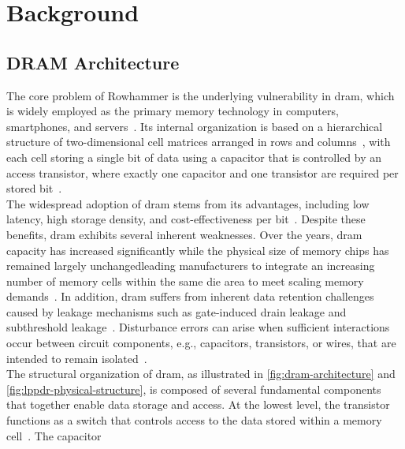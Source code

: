 \section{Background} \label{sec:background}
  \subsection{DRAM Architecture} \label{subsec:dram-architecture}
    The core problem of Rowhammer is the underlying vulnerability in \gls{dram}, which is widely employed as the primary memory technology in 
    computers, smartphones, and servers~\cite{thesisDRAMA, paperRHinDRAM}. Its internal organization is based on a 
    hierarchical structure of two-dimensional cell matrices arranged in rows and columns~\cite{paperRHinDRAM, paperRowhammerOnSteroids, paperDrammer}, 
    with each cell storing  a single bit of data using a capacitor that is controlled by 
    an access transistor, where exactly 
    one capacitor and one transistor are required per stored bit~\cite{paperRHinDRAM, paperRowhammerOnSteroids,thesisDRAMA}.
    \\
    The widespread adoption of \gls{dram} stems from its advantages, 
    including low latency, high storage density, and cost-effectiveness per bit~\cite{paperRHinDRAM}. 
    Despite these benefits, \gls{dram} exhibits several inherent weaknesses. Over the years, \gls{dram} 
    capacity has increased significantly while the physical size of memory chips has remained largely 
    unchangedleading manufacturers to integrate an increasing number of memory cells within the 
    same die area to meet scaling memory demands~\cite{paperOnDRAM,paperTriggeringRHHardwareFault}. In 
    addition, \gls{dram} suffers from inherent data retention challenges caused by leakage mechanisms 
    such as gate-induced drain leakage and subthreshold leakage~\cite{paperFlippingBits, paperRHinDRAM}. 
    Disturbance errors can arise when sufficient interactions occur between circuit components, e.g., capacitors,
    transistors, or wires, that are intended to remain isolated~\cite{paperRHinDRAM}.
    \\
    The structural organization of \gls{dram}, as illustrated in
    \cref{fig:dram-architecture} and \cref{fig:lppdr-physical-structure}, is composed of 
    several fundamental components that together enable data storage and access. At the lowest level, 
    the transistor functions as a switch that controls access to the data stored within a memory 
    cell~\cite{webPhysicalStructure,paperRowhammerOnSteroids, thesisDRAMA}. The capacitor 
